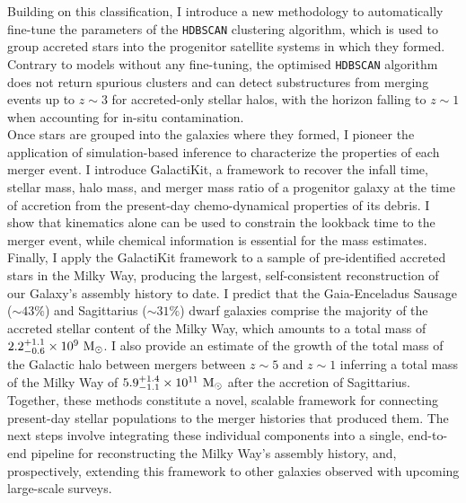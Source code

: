 \documentclass[a4paper,12pt,oneside]{report}
\providecommand{\sun}{\ensuremath{\odot}}
\begin{document}
Building on this classification, I introduce a new methodology to automatically fine-tune the 
parameters of the \texttt{HDBSCAN} clustering algorithm, which is used to group accreted stars 
into the progenitor satellite systems in which they formed. Contrary to models without any
fine-tuning, the optimised \texttt{HDBSCAN} algorithm does not return spurious clusters and can detect substructures 
from merging events up to $z\sim3$ for accreted-only stellar halos, with the horizon falling to $z\sim1$ 
when accounting for in-situ contamination. \\

Once stars are grouped into the galaxies where they formed, I pioneer the application of simulation-based inference 
to characterize the properties of each merger event. I introduce GalactiKit, a framework to recover the
infall time, stellar mass, halo mass, and merger mass ratio of a progenitor galaxy at the time of accretion
from the present-day chemo-dynamical properties of its debris. I show that kinematics alone can be used to
constrain the lookback time to the merger event, while chemical information is essential for the mass estimates. \\

Finally, I apply the GalactiKit framework to a sample of pre-identified accreted stars in the Milky Way, 
producing the largest, self-consistent reconstruction of our Galaxy's assembly history to date. I predict that
the Gaia-Enceladus Sausage ($\sim43\%$) and Sagittarius ($\sim31\%$) dwarf galaxies comprise the majority of the accreted stellar content
of the Milky Way, which amounts to a total mass of $2.2^{+1.1}_{-0.6} \times 10^{9}~\rm{M_{\sun}}$. 
I also provide an estimate of the growth of the total mass of the
Galactic halo between mergers between $z\sim5$ and $z\sim1$ inferring a total mass of the Milky Way of $5.9^{+1.4}_{-1.1} \times 10^{11}~\rm{M_{\sun}}$ 
after the accretion of Sagittarius.  \\

Together, these methods constitute a novel, scalable framework for connecting present-day stellar populations 
to the merger histories that produced them. The next steps involve integrating these individual components 
into a single, end-to-end pipeline for reconstructing the Milky Way's assembly history, and, 
prospectively, extending this framework to other galaxies observed with upcoming large-scale surveys.


\end{document}
